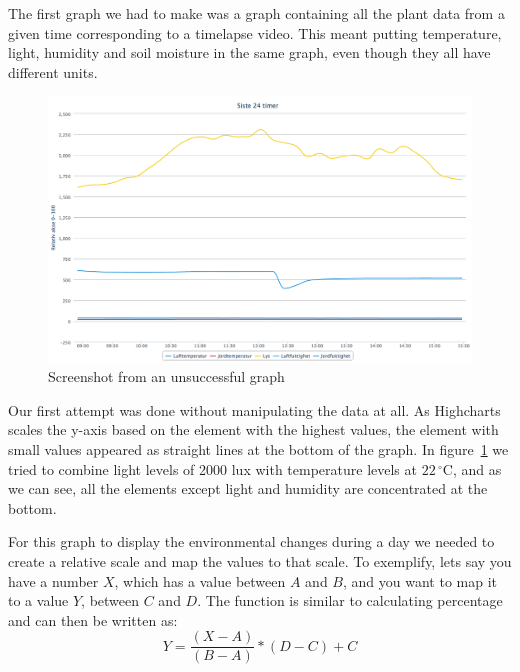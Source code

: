 The first graph we had to make was a graph containing all the plant data from a given time corresponding to a timelapse video. This meant putting temperature, light, humidity and soil moisture in the same graph, even though they all have different units. 



\begin{figure}
\centering
\includegraphics[width=1\textwidth]{img/interface/badgraph.png}
\caption{Screenshot from an unsuccessful graph}
\label{fig:badgraph}
\end{figure}

Our first attempt was done without manipulating the data at all. As Highcharts scales the y-axis based on the element with the highest values, the element with small values appeared as straight lines at the bottom of the graph. In figure~\ref{fig:badgraph} we tried to combine light levels of 2000 lux with temperature levels at $22\,^{\circ}\mathrm{C}$, and as we can see, all the elements except light and humidity are concentrated at the bottom. 

For this graph to display the environmental changes during a day we needed to create a relative scale and map the values to that scale. To exemplify, lets say you have a number \ensuremath{X}, which has a value between \ensuremath{A} and \ensuremath{B}, and you want to map it to a value \ensuremath{Y}, between \ensuremath{C} and \ensuremath{D}. The function is similar to calculating percentage and can then be written as: 
\begin{equation}
Y = \frac{(X-A)}{(B-A)} * (D-C) + C
\end{equation}



